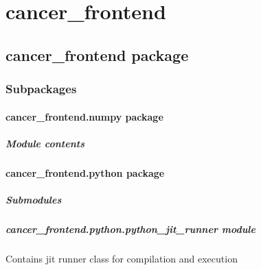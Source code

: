 \documentclass[letterpaper,10pt,english]{sphinxmanual}
\begin{document}
\chapter{cancer\_frontend}
\label{\detokenize{modules:cancer-frontend}}\label{\detokenize{modules::doc}}

\section{cancer\_frontend package}
\label{\detokenize{cancer_frontend:cancer-frontend-package}}\label{\detokenize{cancer_frontend::doc}}

\subsection{Subpackages}
\label{\detokenize{cancer_frontend:subpackages}}

\subsubsection{cancer\_frontend.numpy package}
\label{\detokenize{cancer_frontend.numpy:cancer-frontend-numpy-package}}\label{\detokenize{cancer_frontend.numpy::doc}}

\paragraph{Module contents}
\label{\detokenize{cancer_frontend.numpy:module-contents}}

\subsubsection{cancer\_frontend.python package}
\label{\detokenize{cancer_frontend.python:cancer-frontend-python-package}}\label{\detokenize{cancer_frontend.python::doc}}

\paragraph{Submodules}
\label{\detokenize{cancer_frontend.python:submodules}}

\paragraph{cancer\_frontend.python.python\_jit\_runner module}
\label{\detokenize{cancer_frontend.python:module-cancer_frontend.python.python_jit_runner}}\label{\detokenize{cancer_frontend.python:cancer-frontend-python-python-jit-runner-module}}
\sphinxAtStartPar
Contains jit runner class for compilation and execution
\end{document}
